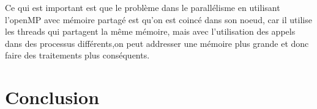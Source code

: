 \documentclass[12pt,titlepage]{article}
\begin{document}
Ce qui est important est que le problème dans le parallélisme en utilisant l'openMP avec mémoire partagé est qu'on est coincé dans son noeud, car il utilise les threads qui partagent la même mémoire, mais avec l'utilisation des appels dans des processus différents,on peut addresser une mémoire plus grande et donc faire des traitements plus conséquents.


\pagebreak

\section{Conclusion}



\pagebreak 

\nocite{*} 



\end{document}
